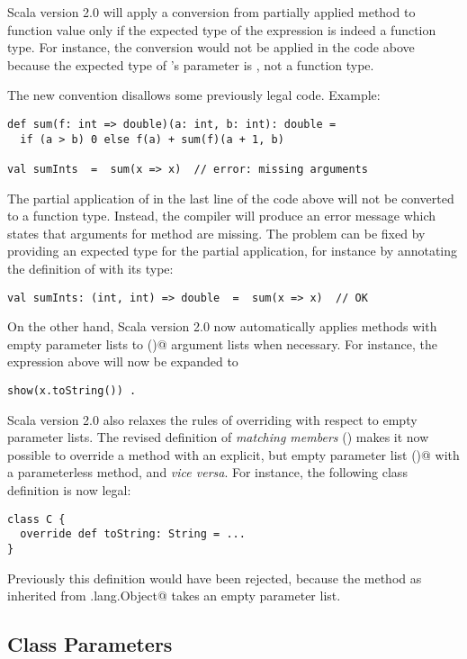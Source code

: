 Scala version 2.0 will apply a conversion from partially applied
method to function value only if the expected type of the expression
is indeed a function type. For instance, the conversion would not be
applied in the code above because the expected type of
\lstinline@show@'s parameter is \lstinline@String@, not a function
type. 

The new convention disallows some previously legal code. Example:
\begin{lstlisting}
def sum(f: int => double)(a: int, b: int): double =
  if (a > b) 0 else f(a) + sum(f)(a + 1, b)

val sumInts  =  sum(x => x)  // error: missing arguments
\end{lstlisting}
The partial application of \lstinline@sum@ in the last line of
the code above will not be converted to a function type. Instead, the
compiler will produce an error message which states that arguments for method
\lstinline@sum@ are missing. The problem can be fixed by providing an
expected type for the partial application, for instance by annotating
the definition of \lstinline@sumInts@ with its type:
\begin{lstlisting}
val sumInts: (int, int) => double  =  sum(x => x)  // OK
\end{lstlisting}

On the other hand, Scala version 2.0 now automatically applies methods
with empty parameter lists to \lstinline@()@ argument lists when
necessary. For instance, the \lstinline@show@ expression above will
now be expanded to
\begin{lstlisting}
show(x.toString()) .
\end{lstlisting}

Scala version 2.0 also relaxes the rules of overriding with respect to
empty parameter lists. The revised definition of {\em matching
members} () makes it now possible to override a
method with an explicit, but empty parameter list \lstinline@()@ with
a parameterless method, and {\em vice versa}. For instance, 
the following class definition is now legal:
\begin{lstlisting}
class C {
  override def toString: String = ...
}
\end{lstlisting}
Previously this definition would have been rejected, because the
\lstinline@toString@ method as inherited from
\lstinline@java.lang.Object@ takes an empty parameter list.  

\subsection*{Class Parameters}


